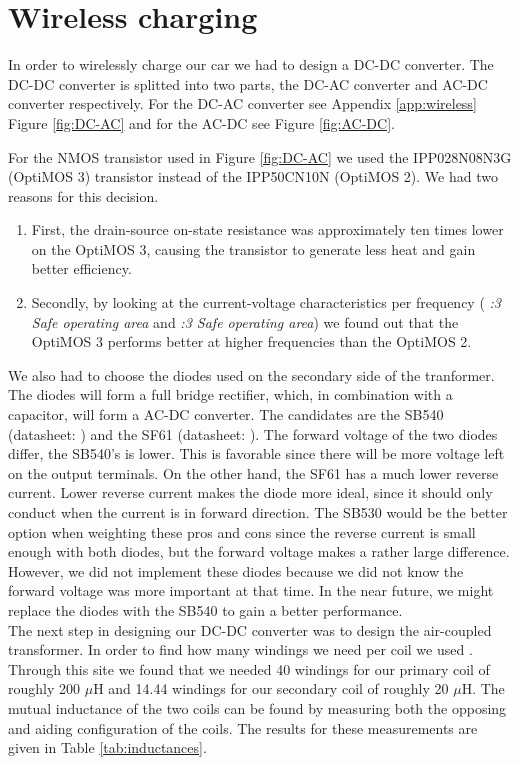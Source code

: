 \documentclass[final]{scrreprt} %
\begin{document}
\chapter{Wireless charging}
In order to wirelessly charge our car we had to design a DC-DC converter. The DC-DC converter is splitted into two parts, the DC-AC converter and AC-DC converter respectively. 
For the DC-AC converter see Appendix \ref{app:wireless} Figure \ref{fig:DC-AC} and for the AC-DC see Figure \ref{fig:AC-DC}.


For the NMOS transistor used in Figure \ref{fig:DC-AC} we used the IPP028N08N3G (OptiMOS 3) transistor instead of the IPP50CN10N (OptiMOS 2).
We had two reasons for this decision.
\begin{enumerate}
\item First, the drain-source on-state resistance was approximately ten times lower on the OptiMOS 3, causing the transistor to generate less heat and gain better efficiency.
\item Secondly, by looking at the current-voltage characteristics per frequency (\cite{OptiMOS2} \emph{:3 Safe operating area} and \cite{OptiMOS3} \emph{:3 Safe operating area}) we found out that the OptiMOS 3 performs better at higher frequencies than the OptiMOS 2.
\end{enumerate}

We also had to choose the diodes used on the secondary side of the tranformer. 
The diodes will form a full bridge rectifier, which, in combination with a capacitor, will form a AC-DC converter.
The candidates are the SB540 (datasheet: \cite{SB540}) and the SF61 (datasheet: \cite{SF61}).
The forward voltage of the two diodes differ, the SB540's is lower. 
This is favorable since there will be more voltage left on the output terminals.
On the other hand, the SF61 has a much lower reverse current. 
Lower reverse current makes the diode more ideal, since it should only conduct when the current is in forward direction.
The SB530 would be the better option when weighting these pros and cons since the reverse current is small enough with both diodes, but the forward voltage makes a rather large difference.
However, we did not implement these diodes because we did not know the forward voltage was more important at that time.
In the near future, we might replace the diodes with the SB540 to gain a better performance. \\




The next step in designing our DC-DC converter was to design the air-coupled transformer. 
In order to find how many windings we need per coil we used \cite{windings}.
Through this site we found that we needed 40 windings for our primary coil of roughly 200 $\mu$H and 14.44 windings for our secondary coil of roughly 20 $\mu$H.
The mutual inductance of the two coils can be found by measuring both the opposing and aiding configuration of the coils. 
The results for these measurements are given in Table \ref{tab:inductances}.
\end{document}
